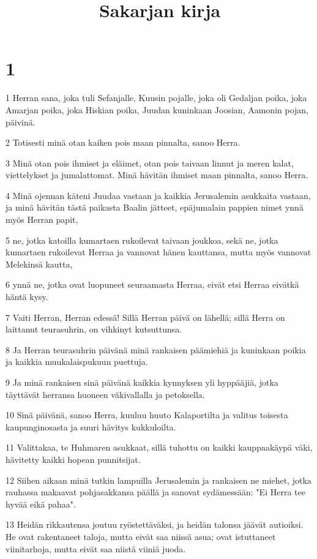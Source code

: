 

\title{Sakarjan kirja}


\chapter{1}

\par 1 Herran sana, joka tuli Sefanjalle, Kuusin pojalle, joka oli Gedaljan poika, joka Amarjan poika, joka Hiskian poika, Juudan kuninkaan Joosian, Aamonin pojan, päivinä.
\par 2 Totisesti minä otan kaiken pois maan pinnalta, sanoo Herra.
\par 3 Minä otan pois ihmiset ja eläimet, otan pois taivaan linnut ja meren kalat, viettelykset ja jumalattomat. Minä hävitän ihmiset maan pinnalta, sanoo Herra.
\par 4 Minä ojennan käteni Juudaa vastaan ja kaikkia Jerusalemin asukkaita vastaan, ja minä hävitän tästä paikasta Baalin jätteet, epäjumalain pappien nimet ynnä myös Herran papit,
\par 5 ne, jotka katoilla kumartaen rukoilevat taivaan joukkoa, sekä ne, jotka kumartaen rukoilevat Herraa ja vannovat hänen kauttansa, mutta myös vannovat Melekinsä kautta,
\par 6 ynnä ne, jotka ovat luopuneet seuraamasta Herraa, eivät etsi Herraa eivätkä häntä kysy.
\par 7 Vaiti Herran, Herran edessä! Sillä Herran päivä on lähellä; sillä Herra on laittanut teurasuhrin, on vihkinyt kutsuttunsa.
\par 8 Ja Herran teurasuhrin päivänä minä rankaisen päämiehiä ja kuninkaan poikia ja kaikkia muukalaispukuun puettuja.
\par 9 Ja minä rankaisen sinä päivänä kaikkia kynnyksen yli hyppääjiä, jotka täyttävät herransa huoneen väkivallalla ja petoksella.
\par 10 Sinä päivänä, sanoo Herra, kuuluu huuto Kalaportilta ja valitus toisesta kaupunginosasta ja suuri hävitys kukkuloilta.
\par 11 Valittakaa, te Huhmaren asukkaat, sillä tuhottu on kaikki kauppaakäypä väki, hävitetty kaikki hopean punnitsijat.
\par 12 Siihen aikaan minä tutkin lampuilla Jerusalemin ja rankaisen ne miehet, jotka rauhassa makaavat pohjasakkansa päällä ja sanovat sydämessään: "Ei Herra tee hyvää eikä pahaa".
\par 13 Heidän rikkautensa joutuu ryöstettäväksi, ja heidän talonsa jäävät autioiksi. He ovat rakentaneet taloja, mutta eivät saa niissä asua; ovat istuttaneet viinitarhoja, mutta eivät saa niistä viiniä juoda.
